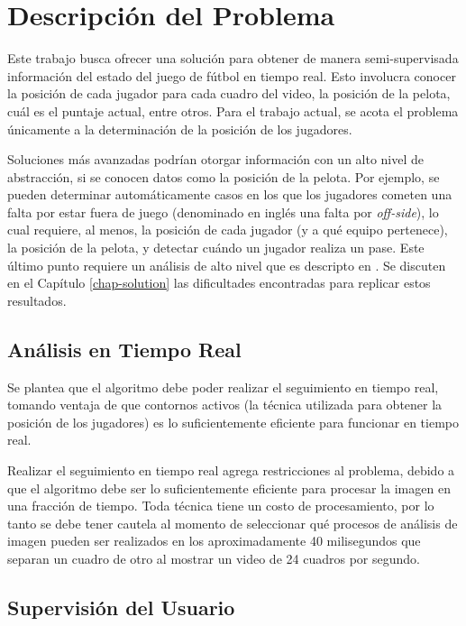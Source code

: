 \chapter{Descripción del Problema}
\label{chap-problems}

Este trabajo busca ofrecer una solución para obtener de manera semi-supervisada
información del estado del juego de fútbol en tiempo real. Esto involucra
conocer la posición de cada jugador para cada cuadro del video, la posición de
la pelota, cuál es el puntaje actual, entre otros. Para el trabajo actual, se
acota el problema únicamente a la determinación de la posición de los
jugadores.

Soluciones más avanzadas podrían otorgar información con un alto nivel de
abstracción, si se conocen datos como la posición de la pelota. Por ejemplo, se
pueden determinar automáticamente casos en los que los jugadores cometen una
falta por estar fuera de juego (denominado en inglés una falta por
\textit{off-side}), lo cual requiere, al menos, la posición de cada jugador (y
a qué equipo pertenece), la posición de la pelota, y detectar cuándo un jugador
realiza un pase. Este último punto requiere un análisis de alto nivel que es
descripto en \cite{papers-tanos}. Se discuten en el Capítulo
\ref{chap-solution} las dificultades encontradas para replicar estos
resultados.

\section{Análisis en Tiempo Real}

Se plantea que el algoritmo debe poder realizar el seguimiento en tiempo
real, tomando ventaja de que contornos activos (la técnica utilizada para
obtener la posición de los jugadores) es lo suficientemente eficiente para
funcionar en tiempo real.

Realizar el seguimiento en tiempo real agrega restricciones al problema, debido
a que el algoritmo debe ser lo suficientemente eficiente para procesar la
imagen en una fracción de tiempo. Toda técnica tiene un costo de procesamiento,
por lo tanto se debe tener cautela al momento de seleccionar qué procesos de
análisis de imagen pueden ser realizados en los aproximadamente 40 milisegundos
que separan un cuadro de otro al mostrar un video de 24 cuadros por segundo.

\section{Supervisión del Usuario}

